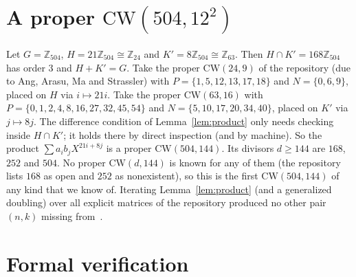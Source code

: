 \documentclass[11pt]{article}
\numberwithin{equation}{section}
\theoremstyle{definition}
\theoremstyle{remark}
\newcommand{\Z}{\mathbb Z}
\newcommand{\CW}{\mathrm{CW}}
\begin{document}
\section{A proper \texorpdfstring{$\CW(504,12^2)$}{CW(504,144)}}\label{sec:504}

Let $G=\Z_{504}$, $H=21\Z_{504}\cong\Z_{24}$ and $K'=8\Z_{504}\cong\Z_{63}$. Then $H\cap K'=168\Z_{504}$
has order $3$ and $H+K'=G$. Take the proper $\CW(24,9)$ of the repository (due to Ang, Arasu, Ma and
Strassler) with $P=\{1,5,12,13,17,18\}$ and $N=\{0,6,9\}$, placed on $H$ via $i\mapsto21i$.
Take the proper $\CW(63,16)$ with $P=\{0,1,2,4,8,16,27,32,45,54\}$ and
$N=\{5,10,17,20,34,40\}$, placed on $K'$ via $j\mapsto8j$. The difference condition of
Lemma~\ref{lem:product} only needs checking inside $H\cap K'$; it holds there by direct
inspection (and by machine). So the product $\sum a_ib_j X^{21i+8j}$ is a proper $\CW(504,144)$.
Its divisors $d\ge144$ are $168$, $252$ and $504$. No proper $\CW(d,144)$ is known for any of
them (the repository lists $168$ as open and $252$ as nonexistent), so this is the first
$\CW(504,144)$ of any kind that we know of.
Iterating Lemma~\ref{lem:product} (and a generalized doubling) over all explicit matrices of
the repository produced no other pair $(n,k)$ missing from~\cite[Table~7]{G26}.

\section{Formal verification}\label{sec:lean}
\end{document}
